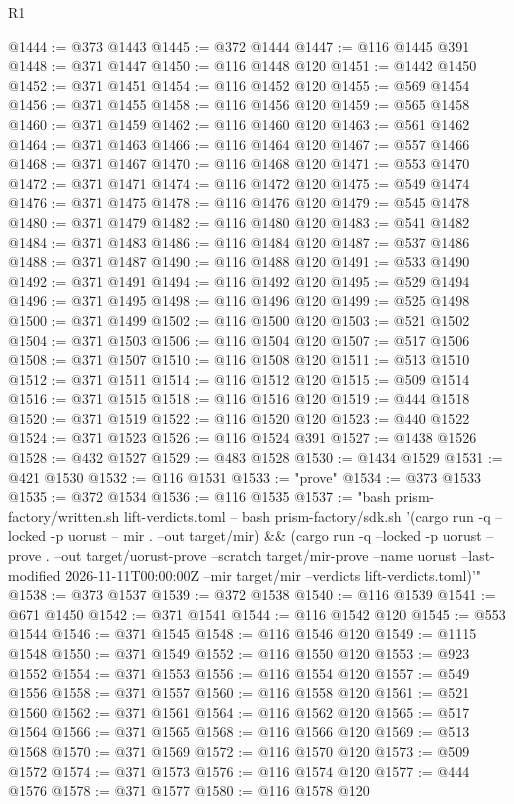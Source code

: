 \begin{lexlean}{R1}
\begin{coremodule}
@1444 := @373 @1443
@1445 := @372 @1444
@1447 := @116 @1445 @391
@1448 := @371 @1447
@1450 := @116 @1448 @120
@1451 := @1442 @1450
@1452 := @371 @1451
@1454 := @116 @1452 @120
@1455 := @569 @1454
@1456 := @371 @1455
@1458 := @116 @1456 @120
@1459 := @565 @1458
@1460 := @371 @1459
@1462 := @116 @1460 @120
@1463 := @561 @1462
@1464 := @371 @1463
@1466 := @116 @1464 @120
@1467 := @557 @1466
@1468 := @371 @1467
@1470 := @116 @1468 @120
@1471 := @553 @1470
@1472 := @371 @1471
@1474 := @116 @1472 @120
@1475 := @549 @1474
@1476 := @371 @1475
@1478 := @116 @1476 @120
@1479 := @545 @1478
@1480 := @371 @1479
@1482 := @116 @1480 @120
@1483 := @541 @1482
@1484 := @371 @1483
@1486 := @116 @1484 @120
@1487 := @537 @1486
@1488 := @371 @1487
@1490 := @116 @1488 @120
@1491 := @533 @1490
@1492 := @371 @1491
@1494 := @116 @1492 @120
@1495 := @529 @1494
@1496 := @371 @1495
@1498 := @116 @1496 @120
@1499 := @525 @1498
@1500 := @371 @1499
@1502 := @116 @1500 @120
@1503 := @521 @1502
@1504 := @371 @1503
@1506 := @116 @1504 @120
@1507 := @517 @1506
@1508 := @371 @1507
@1510 := @116 @1508 @120
@1511 := @513 @1510
@1512 := @371 @1511
@1514 := @116 @1512 @120
@1515 := @509 @1514
@1516 := @371 @1515
@1518 := @116 @1516 @120
@1519 := @444 @1518
@1520 := @371 @1519
@1522 := @116 @1520 @120
@1523 := @440 @1522
@1524 := @371 @1523
@1526 := @116 @1524 @391
@1527 := @1438 @1526
@1528 := @432 @1527
@1529 := @483 @1528
@1530 := @1434 @1529
@1531 := @421 @1530
@1532 := @116 @1531
@1533 := "prove"
@1534 := @373 @1533
@1535 := @372 @1534
@1536 := @116 @1535
@1537 := "bash prism-factory/written.sh lift-verdicts.toml -- bash prism-factory/sdk.sh '(cargo run -q --locked -p uorust -- mir . --out target/mir) && (cargo run -q --locked -p uorust -- prove . --out target/uorust-prove --scratch target/mir-prove --name uorust --last-modified 2026-11-11T00:00:00Z --mir target/mir --verdicts lift-verdicts.toml)'"
@1538 := @373 @1537
@1539 := @372 @1538
@1540 := @116 @1539
@1541 := @671 @1450
@1542 := @371 @1541
@1544 := @116 @1542 @120
@1545 := @553 @1544
@1546 := @371 @1545
@1548 := @116 @1546 @120
@1549 := @1115 @1548
@1550 := @371 @1549
@1552 := @116 @1550 @120
@1553 := @923 @1552
@1554 := @371 @1553
@1556 := @116 @1554 @120
@1557 := @549 @1556
@1558 := @371 @1557
@1560 := @116 @1558 @120
@1561 := @521 @1560
@1562 := @371 @1561
@1564 := @116 @1562 @120
@1565 := @517 @1564
@1566 := @371 @1565
@1568 := @116 @1566 @120
@1569 := @513 @1568
@1570 := @371 @1569
@1572 := @116 @1570 @120
@1573 := @509 @1572
@1574 := @371 @1573
@1576 := @116 @1574 @120
@1577 := @444 @1576
@1578 := @371 @1577
@1580 := @116 @1578 @120

\end{coremodule}
\end{lexlean}
